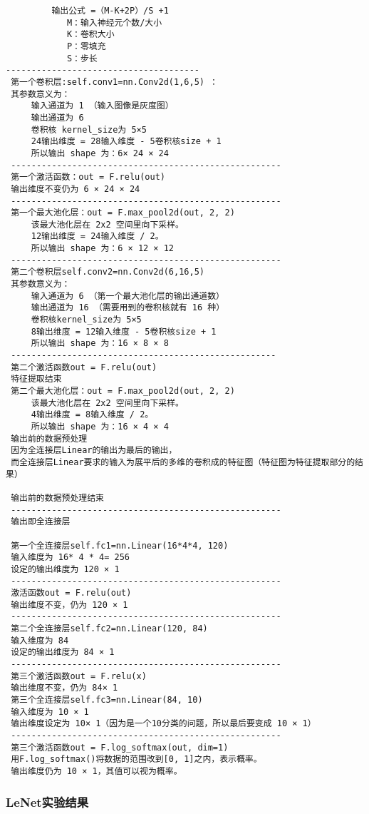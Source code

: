 \begin{lstlisting}
		 输出公式 =（M-K+2P）/S +1
			M：输入神经元个数/大小
			K：卷积大小
			P：零填充
			S：步长
--------------------------------------
 第一个卷积层:self.conv1=nn.Conv2d(1,6,5) ：
 其参数意义为：
     输入通道为 1 （输入图像是灰度图）
     输出通道为 6
     卷积核 kernel_size为 5×5
     24输出维度 = 28输入维度 - 5卷积核size + 1
     所以输出 shape 为：6× 24 × 24
 -----------------------------------------------------
 第一个激活函数：out = F.relu(out)
 输出维度不变仍为 6 × 24 × 24
 -----------------------------------------------------
 第一个最大池化层：out = F.max_pool2d(out, 2, 2)
     该最大池化层在 2x2 空间里向下采样。
     12输出维度 = 24输入维度 / 2。
     所以输出 shape 为：6 × 12 × 12
 -----------------------------------------------------
 第二个卷积层self.conv2=nn.Conv2d(6,16,5)
 其参数意义为：
     输入通道为 6 （第一个最大池化层的输出通道数）
     输出通道为 16 （需要用到的卷积核就有 16 种）
     卷积核kernel_size为 5×5
     8输出维度 = 12输入维度 - 5卷积核size + 1
     所以输出 shape 为：16 × 8 × 8
 ----------------------------------------------------
 第二个激活函数out = F.relu(out)
 特征提取结束
 第二个最大池化层：out = F.max_pool2d(out, 2, 2)
     该最大池化层在 2x2 空间里向下采样。
     4输出维度 = 8输入维度 / 2。
     所以输出 shape 为：16 × 4 × 4
 输出前的数据预处理
 因为全连接层Linear的输出为最后的输出，
 而全连接层Linear要求的输入为展平后的多维的卷积成的特征图（特征图为特征提取部分的结果）

 输出前的数据预处理结束
 -----------------------------------------------------
 输出即全连接层

 第一个全连接层self.fc1=nn.Linear(16*4*4, 120)
 输入维度为 16* 4 * 4= 256
 设定的输出维度为 120 × 1
 -----------------------------------------------------
 激活函数out = F.relu(out)
 输出维度不变，仍为 120 × 1
 -----------------------------------------------------
 第二个全连接层self.fc2=nn.Linear(120, 84)
 输入维度为 84
 设定的输出维度为 84 × 1
 -----------------------------------------------------
 第三个激活函数out = F.relu(x)
 输出维度不变，仍为 84× 1
 第三个全连接层self.fc3=nn.Linear(84, 10)
 输入维度为 10 × 1
 输出维度设定为 10× 1（因为是一个10分类的问题，所以最后要变成 10 × 1）
 -----------------------------------------------------
 第三个激活函数out = F.log_softmax(out, dim=1)
 用F.log_softmax()将数据的范围改到[0, 1]之内，表示概率。
 输出维度仍为 10 × 1，其值可以视为概率。
\end{lstlisting}
\subsubsection{LeNet实验结果}

